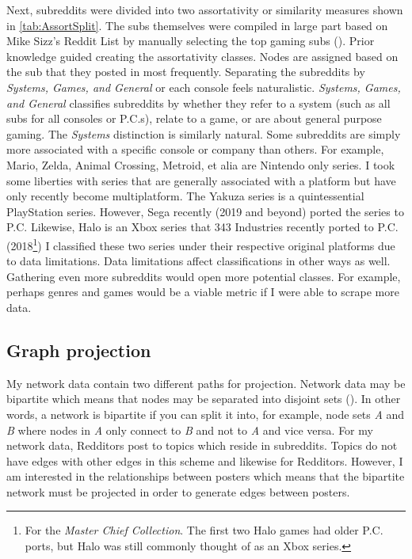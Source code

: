 \documentclass[12pt, a4paper]{article}
\begin{document}
Next, subreddits were divided into two assortativity or similarity measures shown in \ref{tab:AssortSplit}. The subs themselves were compiled in large part based on Mike Sizz's Reddit List by manually selecting the top gaming subs (\cite{redditlist}). Prior knowledge guided creating the assortativity classes. Nodes are assigned based on the sub that they posted in most frequently. Separating the subreddits by \textit{Systems, Games, and General} or each console feels naturalistic. \textit{Systems, Games, and General} classifies subreddits by whether they refer to a system (such as all subs for all consoles or P.C.s), relate to a game, or are about general purpose gaming. The \textit{Systems} distinction is similarly natural. Some subreddits are simply more associated with a specific console or company than others. For example, Mario, Zelda, Animal Crossing, Metroid, et alia are Nintendo only series. I took some liberties with series that are generally associated with a platform but have only recently become multiplatform. The Yakuza series is a quintessential PlayStation series. However, Sega recently (2019 and beyond) ported the series to P.C. Likewise, Halo is an Xbox series that 343 Industries recently ported to P.C. (2018\footnote{For the \textit{Master Chief Collection}. The first two Halo games had older P.C. ports, but Halo was still commonly thought of as an Xbox series.}) I classified these two series under their respective original platforms due to data limitations. Data limitations affect classifications in other ways as well. Gathering even more subreddits would open more potential classes. For example, perhaps genres and games would be a viable metric if I were able to scrape more data.

\subsection{Graph projection}

My network data contain two different paths for projection. Network data may be bipartite which means that nodes may be separated into disjoint sets (\cite{banerjee2017}). In other words, a network is bipartite if you can split it into, for example, node sets \textit{A} and \textit{B} where nodes in \textit{A} only connect to \textit{B} and not to \textit{A} and vice versa. For my network data, Redditors post to topics which reside in subreddits. Topics do not have edges with other edges in this scheme and likewise for Redditors. However, I am interested in the relationships between posters which means that the bipartite network must be projected in order to generate edges between posters.
\end{document}
